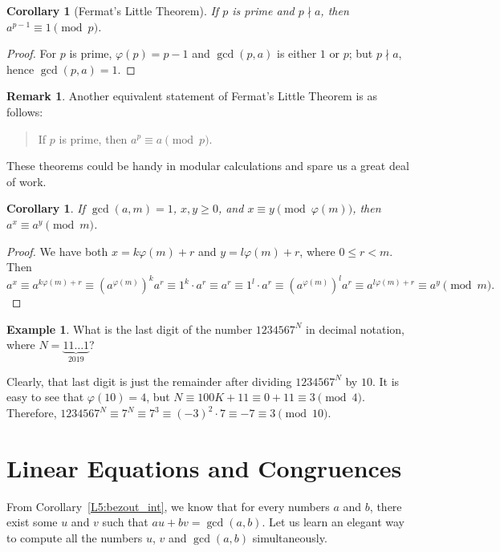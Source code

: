 \documentclass[12pt,notitlepage]{article}
\theoremstyle{plain}
\newtheorem{corr}[thm]{Corollary}
\theoremstyle{definition}
\newtheorem{exm}[thm]{Example}
\newtheorem{rem}[thm]{Remark}
\theoremstyle{plain}
\renewcommand{\phi}{\varphi}
\newcommand{\1}{\mathbf{1}}
\newcommand{\0}{\mathbf{0}}
\newcommand{\ndvd}{\mathop{\nmid}}
\begin{document}
\begin{corr}[Fermat's Little Theorem]
If $p$ is prime and $p \ndvd a$, then $a^{p - 1} \equiv 1 \pmod p$.
\end{corr}
\begin{proof}
For $p$ is prime, $\phi(p) = p - 1$ and $\gcd(p, a)$ is either $1$ or $p$; but $p \ndvd a$, hence $\gcd(p,a) = 1$.
\end{proof}
\begin{rem}
Another equivalent statement of Fermat's Little Theorem is as follows:
\begin{quote}
 If $p$ is prime, then $a^p \equiv a \pmod p$.
\end{quote}
\end{rem}
\noindent  These theorems could be handy in modular calculations and spare us a great deal of work.
\begin{corr}
If $\gcd(a, m) = 1$, $x, y \geq 0$, and $x \equiv y \pmod {\phi(m)}$, then $a^x \equiv a^y \pmod m$.
\end{corr}
\begin{proof}
We have both $x = k\phi(m) + r$ and $y = l\phi(m) + r$, where $0 \leq r < m$. Then
$$a^x \equiv a^{k\phi(m) + r} \equiv (a^{\phi(m)})^k a^r \equiv 1^k \cdot a^r \equiv a^r \equiv 1^l \cdot a^r \equiv (a^{\phi(m)})^l a^r \equiv a^{l\phi(m) + r} \equiv a^y \pmod m.$$
\end{proof}
\begin{exm}
What is the last digit of the number $1234567^N$ in decimal notation, where $N = {\underbrace{11\ldots1}_{2019}}$?

Clearly, that last digit is just the remainder after dividing $1234567^N$ by $10$. It is easy to see that $\phi(10) = 4$, but $N \equiv 100K + 11 \equiv 0 + 11 \equiv 3 \pmod 4$. Therefore, $1234567^N \equiv 7^N \equiv 7^3 \equiv (-3)^2 \cdot 7 \equiv -7 \equiv 3 \pmod{10}$.
\end{exm}



\section{Linear Equations and Congruences}

From Corollary~\ref{L5:bezout_int}, we know that for every numbers $a$ and $b$, there exist some $u$ and $v$ such that $a u + b v = \gcd(a,b)$. Let us learn an elegant way to compute all the numbers $u$, $v$ and $\gcd(a,b)$ simultaneously.
\end{document}
